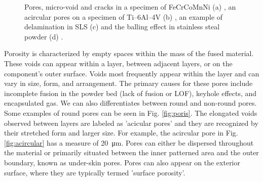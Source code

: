 \begin{figure}
{    }
    \qquad
    \qquad
    \caption[Defect examples in PBF.]{Pores, micro-void and cracks in a specimen of FeCrCoMnNi (a) \cite{mostafaei_defects_2022}, an acircular pores on a specimen of Ti–6Al–4V (b) \cite{tammas-williams_xct_2015}, an example of delamination in SLS (c) \cite{sames_metallurgy_2016} and the balling effect in stainless steal powder (d) \cite{li_balling_2012}.}
\end{figure} 
Porosity is characterized by empty spaces within the mass of the fused material. These voids can appear within a layer, between adjacent layers, or on the component's outer surface. Voids most frequently appear within the layer and can vary in size, form, and arrangement. The primary causes for these pores include incomplete fusion in the powder bed (lack of fusion or LOF), keyhole effects, and encapsulated gas. We can also differentiates between round and non-round pores. Some examples of round pores can be seen in Fig. \ref{fig:poris}. The elongated voids observed between layers are labeled as 'acicular pores' and they are recognized by their stretched form and larger size. For example, the acircular pore in Fig. \ref{fig:acircular} has a measure of \SI{20}{\micro\metre}. Pores can either be dispersed throughout the material or primarily situated between the inner patterned area and the outer boundary, known as under-skin pores. Pores can also appear on the exterior surface, where they are typically termed 'surface porosity'.
